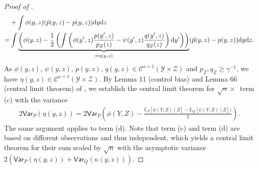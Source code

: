 \documentclass{article}
\theoremstyle{plain}
\theoremstyle{definition}
\def\EE{\mathbb{E}}
\def\PP{P}
\def\QQ{Q}
\def\calK{\mathcal{K}}
\def\var{\mathsf{Var}}
\theoremstyle{plain}
\def \var {\mathsf{Var}}
\newcommand{\diff}{{\rm d}}
\def\EE{\mathbb{E}}
\def\calK{\mathcal{K}}
\def\var{\mathsf{Var}}
\begin{document}
\begin{proof}[Proof of ]
\begin{align*}
     &+ \int \phi(y,z) (\hat p(y,z) - p(y,z))  \diff y\diff z\\
     =& \int \underbrace{\left(\phi(y,z)-\frac{1}{2}\left(\int\left(\phi(y',z) \frac{p(y',z)}{p_Z(z)}-\psi(y',z) \frac{q(y',z)}{q_Z(z)}\right) \diff y'\right) \right)}_{=\eta(y,z)} (\hat p(y,z) - p(y,z))  \diff y\diff z.
\end{align*}
As $\phi(y,z)$, $\psi(y,z)$, $p(y,z)$, $q(y,z) \in \mathcal{C}^{s+1}(\mathcal Y \times \mathcal Z)$ and $p_Z, q_Z \geq \gamma^{-1}$, we have $\eta(y,z) \in \mathcal C^{s+1}(\mathcal Y \times \mathcal Z)$.
By Lemma 11 (control bias) and Lemma 66 (central limit theorem) of \parencite{manole2024plugin}, we establish the central limit theorem for $\sqrt{n} \times$~term (c) with the variance
\begin{align*}
    2\var_{\PP}\left(\eta(y,z)\right)
    =2\var_{\PP}\left(\phi(Y,Z) - \frac{\EE_{\PP}[\phi(Y,Z) \mid Z] - \EE_{\QQ}[\psi(Y,Z) \mid Z])}{2}\right).
\end{align*} 
The same argument applies to term (d). 
Note that term (c) and term (d) are based on different observations and thus independent, which yields a central limit theorem for their sum scaled by $\sqrt{n}$ with the asymptotic variance $2 \left(\var_{\PP}\left(\eta(y,z)\right) + \var_{\QQ}\left(\kappa(y,z)\right)\right)$.
\end{proof}




\end{document}
